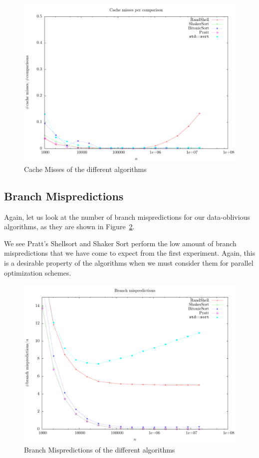 \begin{figure}
\center
\includegraphics[width=\textwidth]{graphs/Shellsorts/cache-misses.pdf}
\caption{Cache Misses of the different algorithms}
\label{fig:Shellsorts:cachemisses}
\end{figure}

\subsection{Branch Mispredictions}

Again, let us look at the number of branch mispredictions for our data-oblivious algorithms, as they are  shown in Figure~\ref{fig:Shellsorts:branchmisses}.

We see Pratt's Shellsort and Shaker Sort perform the low amount of branch mispredictions that we have come to expect from the first experiment. Again, this is a desirable property of the algorithms when we must consider them for parallel optimization schemes.

\begin{figure}
\center
\includegraphics[width=\textwidth]{graphs/Shellsorts/branch-misses.pdf}
\caption{Branch Mispredictions of the different algorithms}
\label{fig:Shellsorts:branchmisses}
\end{figure}

